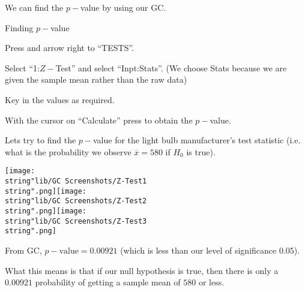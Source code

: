 \documentclass[11pt,a4paper]{book}
\begin{document}
We can find the $p-$value by using our GC.

\begin{GC}{Finding $p-$value}
\begin{steps}[leftmargin=1.5cm]

\item  Press \tcbox[box align=base,nobeforeafter,colback=black, colframe=black,size=small]{\textbf{\textcolor{white}{stat}}}
and arrow right to ``TESTS''.

\item  Select ``1:$Z-$Test'' and select ``Inpt:Stats''. (We
choose Stats because we are given the sample mean rather than the
raw data)

\item  Key in the values as required.

\item  With the cursor on ``Calculate'' press \tcbox[box align=base,nobeforeafter,colback=white, colframe=black,size=small]{\textbf{\textcolor{black}{enter}}}
to obtain the $p-$value.

\end{steps}

\end{GC}

Lets try to find the $p-$value for the light bulb manufacturer's
test statistic (i.e. what is the probability we observe $\overline{x}=580$
if $H_{0}$ is true).
\begin{center}
\texttt{[image: \\string"lib/GC Screenshots/Z-Test1\\string".png]}\hspace{1cm}\texttt{[image: \\string"lib/GC Screenshots/Z-Test2\\string".png]}\hspace{1cm}\texttt{[image: \\string"lib/GC Screenshots/Z-Test3\\string".png]}
\par\end{center}

From GC, $p-\text{value}=0.00921$ (which is less than our level of
significance 0.05).

What this means is that if our null hypothesis is true, then there
is only a $0.00921$ probability of getting a sample mean of $580$
or less.

\medskip

\end{document}
